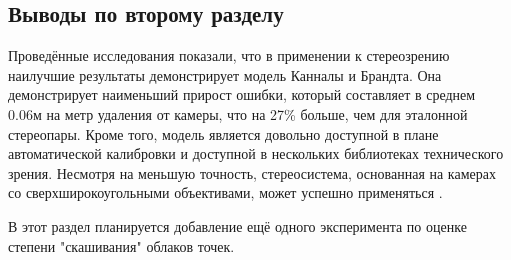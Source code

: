 \subsection{Выводы по второму разделу}

Проведённые исследования показали, что в применении к стереозрению наилучшие результаты демонстрирует модель Канналы и Брандта. Она демонстрирует наименьший 
прирост ошибки, который составляет в среднем 0.06м на метр удаления от камеры, что на 27\% больше, чем для эталонной стереопары. Кроме того, модель является довольно доступной 
в плане автоматической калибровки и доступной в нескольких библиотеках технического зрения. Несмотря на меньшую точность, 
стереосистема, основанная на камерах со сверхширокоугольными объективами, может успешно применяться \cite{}.

В этот раздел планируется добавление ещё одного эксперимента по оценке степени "скашивания" облаков точек. 